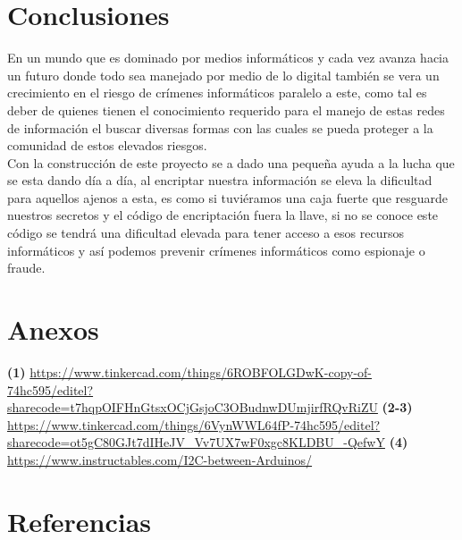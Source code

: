 \documentclass{article}
\begin{document}
\section{Conclusiones}
\label{Conclusiones}
\begin{justify}
En un mundo que es dominado por medios informáticos y cada vez avanza hacia un futuro donde todo sea manejado por medio de lo digital también se vera un crecimiento en el riesgo de crímenes informáticos paralelo a este, como tal es deber de quienes tienen el conocimiento requerido para el manejo de estas redes de información el buscar diversas formas con las cuales se pueda proteger a la comunidad de estos elevados riesgos.\\

Con la construcción de este proyecto se a dado una pequeña ayuda a la lucha que se esta dando día a día, al encriptar nuestra información se eleva la dificultad para aquellos ajenos a esta, es como si tuviéramos una caja fuerte que resguarde nuestros secretos y el código de encriptación fuera la llave, si no se conoce este código se tendrá una dificultad elevada para tener acceso a esos recursos informáticos y así podemos prevenir crímenes informáticos como espionaje o fraude.
\end{justify}


\newpage
\section{Anexos}
\label{Anexos}
\begin{justify}


\textbf{(1)}
\url{https://www.tinkercad.com/things/6ROBFOLGDwK-copy-of-74hc595/editel?sharecode=t7hqpOIFHnGtsxOCjGsjoC3OBudnwDUmjirfRQvRiZU}
\newline
\newline
\textbf{(2-3)}
\url{https://www.tinkercad.com/things/6VynWWL64fP-74hc595/editel?sharecode=ot5gC80GJt7dIHeJV_Vv7UX7wF0xgc8KLDBU_-QefwY}
\newline
\newline
\textbf{(4)}
\url{https://www.instructables.com/I2C-between-Arduinos/}
\end{justify}
\newpage
\section{Referencias}
\label{Referencias}
\end{document}
